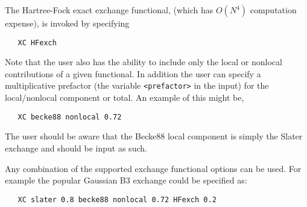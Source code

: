 %
%
%
%
%
%
%
%


The Hartree-Fock exact exchange functional, (which has $O(N^4)$
computation expense), is invoked by specifying
\begin{verbatim}
   XC HFexch
\end{verbatim}

Note that the user also has the ability to include only the local or
nonlocal contributions of a given functional.  In addition the user
can specify a multiplicative prefactor (the variable
\verb+<prefactor>+ in the input) for the local/nonlocal component or
total.  An example of this might be,
\begin{verbatim}
   XC becke88 nonlocal 0.72
\end{verbatim}
The user should be aware that the Becke88 local component is simply
the Slater exchange and should be input as such.

Any combination of the supported exchange functional options can be
used.  For example the popular Gaussian B3 exchange could be specified
as:
\begin{verbatim}
   XC slater 0.8 becke88 nonlocal 0.72 HFexch 0.2
\end{verbatim}

